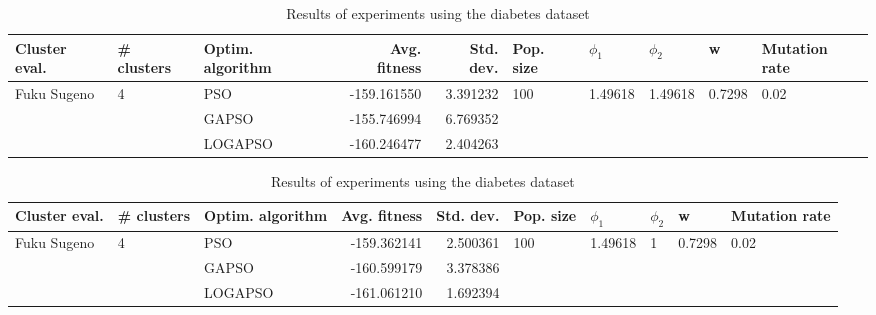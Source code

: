 \documentclass{article}
\begin{document}
\begin{table}
\centering
\caption{Results of experiments using the diabetes dataset}
\begin{tabular}{lllrrlllll}
\toprule
               Cluster eval. &        \# clusters & Optim. algorithm &  Avg. fitness &  Std. dev. &            Pop. size &               $\phi_{1}$ &               $\phi_{2}$ &                       w &         Mutation rate \\
\midrule
\multirow{3}{*}{Fuku Sugeno} & \multirow{3}{*}{4} &              PSO &   -159.161550 &   3.391232 & \multirow{3}{*}{100} & \multirow{3}{*}{1.49618} & \multirow{3}{*}{1.49618} & \multirow{3}{*}{0.7298} & \multirow{3}{*}{0.02} \\
                             &                    &            GAPSO &   -155.746994 &   6.769352 &                      &                          &                          &                         &                       \\
                             &                    &          LOGAPSO &   -160.246477 &   2.404263 &                      &                          &                          &                         &                       \\
\bottomrule
\end{tabular}
\end{table}
\begin{table}
\centering
\caption{Results of experiments using the diabetes dataset}
\begin{tabular}{lllrrlllll}
\toprule
               Cluster eval. &        \# clusters & Optim. algorithm &  Avg. fitness &  Std. dev. &            Pop. size &               $\phi_{1}$ &         $\phi_{2}$ &                       w &         Mutation rate \\
\midrule
\multirow{3}{*}{Fuku Sugeno} & \multirow{3}{*}{4} &              PSO &   -159.362141 &   2.500361 & \multirow{3}{*}{100} & \multirow{3}{*}{1.49618} & \multirow{3}{*}{1} & \multirow{3}{*}{0.7298} & \multirow{3}{*}{0.02} \\
                             &                    &            GAPSO &   -160.599179 &   3.378386 &                      &                          &                    &                         &                       \\
                             &                    &          LOGAPSO &   -161.061210 &   1.692394 &                      &                          &                    &                         &                       \\
\bottomrule
\end{tabular}
\end{table}
\end{document}
